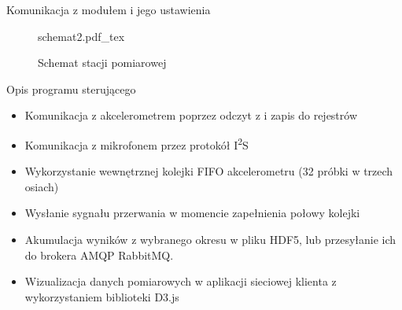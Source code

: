 \documentclass[aspectratio=1610,polish]{beamer} %
\begin{document}
  \begin{frame}{Komunikacja z modułem i jego ustawienia}
    \begin{figure}
      \centering
      {schemat2.pdf_tex}
      \caption{Schemat stacji pomiarowej}
    \end{figure}
  \end{frame}
  \begin{frame}{Opis programu sterującego}
      \begin{itemize}
        \item Komunikacja z akcelerometrem poprzez odczyt z i zapis do rejestrów
	\item Komunikacja z mikrofonem przez protokół I\textsuperscript{2}S
        \item Wykorzystanie wewnętrznej kolejki FIFO akcelerometru (32 próbki w trzech osiach)
        \item Wysłanie sygnału przerwania w momencie zapełnienia połowy kolejki
        \item Akumulacja wyników z wybranego okresu w pliku HDF5, lub
	  przesyłanie ich do brokera AMQP RabbitMQ.
	\item Wizualizacja danych pomiarowych w aplikacji sieciowej klienta z
	  wykorzystaniem biblioteki D3.js
      \end{itemize}
  \end{frame}
  
\end{document}
